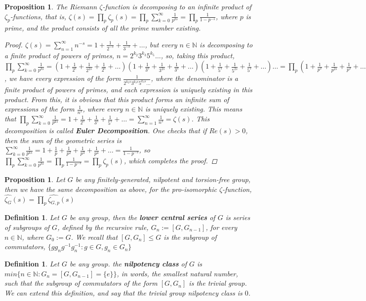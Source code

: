 \documentclass[12pt]{article}
\newtheorem{proposition}[theorem]{Proposition}
\newtheorem{definition}[theorem]{Definition}
\begin{document}
\begin{proposition}
\label{prop:zeta.decomposition}
The Riemann $\zeta$-function is decomposing to an infinite product of $\zeta_p$-functions, that is, $\zeta(s)=\prod_p\zeta_p(s)=\prod_p\sum_{k=0}^\infty\frac{1}{p^{ks}}=\prod_p\frac{1}{1-p^{-s}}$, where $p$ is prime, and the product consists of all the prime number existing.
\begin{proof}
$\zeta(s)=\sum_{n=1}^{\infty}n^{-s}=1+\frac{1}{2^{-s}}+\frac{1}{3^{-s}}+\dots$, but every $n\in\mathbb{N}$ is decomposing to a finite product of powers of primes, $n=2^{k_2}3^{k_3}5^{k_5}\dots$, so, taking this product, $\prod_p\sum_{k=0}^{\infty}\frac{1}{p^{ks}}=(1+\frac{1}{2^s}+\frac{1}{2^{2s}}+\frac{1}{2^s}+\dots)(1+\frac{1}{3^s}+\frac{1}{3^{2s}}+\frac{1}{3^s}+\dots)(1+\frac{1}{5^s}+\frac{1}{5^{2s}}+\frac{1}{5^s}+\dots)\dots=\prod_p(1+\frac{1}{p^s}+\frac{1}{p^{2s}}+\frac{1}{p^s}+\dots)$, we have every expression of the form $\frac{1}{2^{k_2s}3^{k_3s}5^{k_5s}\dots}$, where the denominator is a finite product of powers of primes, and each expression is uniquely existing in this product. From this, it is obvious that this product forms an infinite sum of expressions of the form $\frac{1}{n^s}$, where every $n\in\mathbb{N}$ is uniquely existing. This means that $\prod_p\sum_{k=0}^{\infty}\frac{1}{p^{ks}}=1+\frac{1}{2^s}+\frac{1}{3^s}+\frac{1}{5^s}+\dots=\sum_{n=1}^\infty\frac{1}{n^s}=\zeta(s)$. This decomposition is called \textbf{Euler Decomposition}. One checks that if $Re(s)>0$, then the sum of the geometric series is $\sum_{k=0}^{\infty}\frac{1}{p^{ks}}=1+\frac{1}{p}+\frac{1}{p^2}+\frac{1}{p^3}+\frac{1}{p^4}+\dots=\frac{1}{1-p^{-s}}$, so $\prod_p\sum_{k=0}^{\infty}\frac{1}{p^{ks}}=\prod_p\frac{1}{1-p^{-s}}=\prod_p\zeta_p(s)$, which completes the proof.
\end{proof}
\end{proposition}
\begin{proposition}
\label{prop.proisomorphic.decomposition}
Let $G$ be any finitely-generated, nilpotent and torsion-free group, then we have the same decomposition as above, for the pro-isomorphic $\zeta$-function, $\widehat{\zeta_G}(s)=\prod_p\widehat{\zeta_{G,p}}(s)$
\end{proposition}
\begin{definition}
\label{def.lower.central.series}
Let $G$ be any group, then the \textbf{lower central series} of $G$ is series of subgroups of $G$, defined by the recursive rule, $G_n:=[G,G_{n-1}]$, for every $n\in\mathbb{N}$, where $G_0:=G$.  We recall that $[G,G_n]\leq G$ is the subgroup of commutators, $\{gg_ng^{-1}g_n^{-1} : g\in G,g_n\in G_n\}$
\end{definition}
\begin{definition}
\label{def.nilpotency.class}
Let $G$ be any group. the \textbf{nilpotency class} of $G$ is $min\{n\in\mathbb{N} : G_n=[G,G_{n-1}]=\{e\}\}$, in words, the smallest natural number, such that the subgroup of commutators of the form $[G,G_n]$ is the trivial group. We can extend this definition, and say that the trivial group nilpotency class is $0$.
\end{definition}
\end{document}
